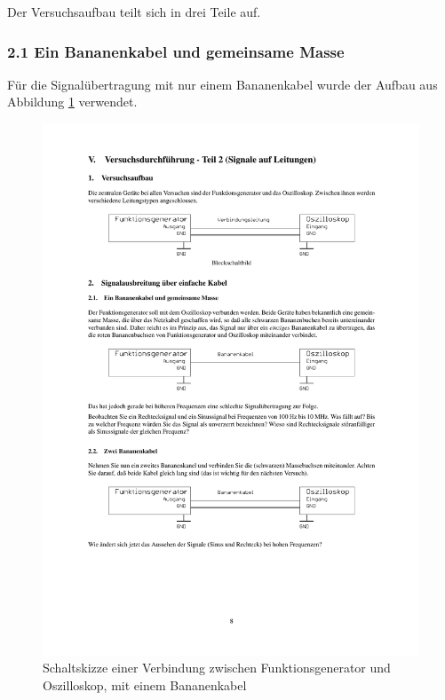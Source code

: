 \documentclass[12pt,a4paper]{article}
\begin{document}
Der Versuchsaufbau teilt sich in drei Teile auf.

\subsubsection{2.1 Ein Bananenkabel und gemeinsame Masse}

Für die Signalübertragung mit nur einem Bananenkabel wurde der Aufbau aus Abbildung \ref{fig:2.1} verwendet.

\begin{figure}[H] 
  \centering
    \includegraphics[trim = 10mm 142mm 10mm 125mm, clip, scale = 1]{2_0-2_2.pdf}
  	\caption[Schaltskizze einer Verbindung zwischen Funktionsgenerator und Oszilloskop, mit einem Bananenkabel]{Schaltskizze einer Verbindung zwischen Funktionsgenerator und Oszilloskop, mit einem Bananenkabel\footnotemark}
  \label{fig:2.1}
\end{figure}
\end{document}
